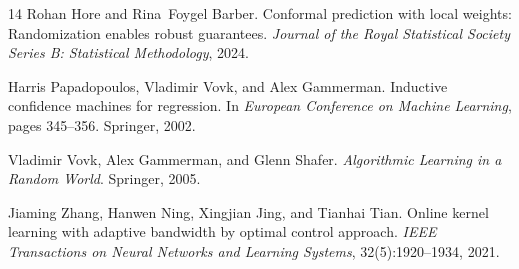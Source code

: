 \documentclass{article}
\theoremstyle{definition}
\begin{document}
\begin{small}
\begin{thebibliography}{14}
Rohan Hore and Rina~Foygel Barber.
\newblock Conformal prediction with local weights: Randomization enables robust guarantees.
\newblock \emph{Journal of the Royal Statistical Society Series B: Statistical Methodology}, 2024.

Harris Papadopoulos, Vladimir Vovk, and Alex Gammerman.
\newblock Inductive confidence machines for regression.
\newblock In \emph{European Conference on Machine Learning}, pages 345--356. Springer, 2002.

Vladimir Vovk, Alex Gammerman, and Glenn Shafer.
\newblock \emph{Algorithmic Learning in a Random World}.
\newblock Springer, 2005.

Jiaming Zhang, Hanwen Ning, Xingjian Jing, and Tianhai Tian.
\newblock Online kernel learning with adaptive bandwidth by optimal control approach.
\newblock \emph{IEEE Transactions on Neural Networks and Learning Systems}, 32(5):1920--1934, 2021.

\end{thebibliography}
\end{small}
\end{document}
